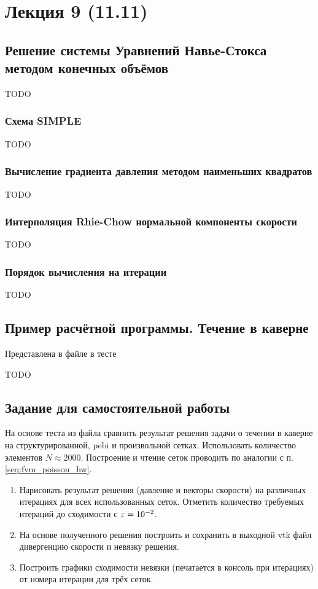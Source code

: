 \section{Лекция 9 (11.11)}

\subsection{Решение системы Уравнений Навье-Стокса методом конечных объёмов}
TODO

\subsubsection{Схема SIMPLE}
TODO

\subsubsection{Вычисление градиента давления методом наименьших квадратов}
TODO

\subsubsection{Интерполяция Rhie-Chow нормальной компоненты скорости} 
TODO

\subsubsection{Порядок вычисления на итерации}
TODO

\subsection{Пример расчётной программы. Течение в каверне}
Представлена в файле 
в тесте 

TODO

\subsection{Задание для самостоятельной работы}
На основе теста  из файла 
сравнить результат решения задачи
о течении в каверне на
структурированной, pebi и произвольной сетках.
Использовать количество элементов $N\approx2000$.
Построение и чтение сеток проводить по аналогии с п.\ref{seq:fvm_poisson_hw}.

\begin{enumerate}
\item
Нарисовать результат решения (давление и векторы скорости)
на различных итерациях для всех использованных сеток.
Отметить количество требуемых итераций до сходимости с $\varepsilon=10^{-2}$.

\item
На основе полученного решения построить и сохранить
в выходной vtk файл дивергенцию скорости и невязку решения.

\item
Построить графики сходимости невязки (печатается в консоль при итерациях) от номера итерации для трёх сеток.
\end{enumerate}

